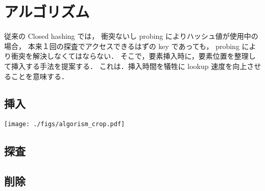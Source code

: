\chapter{アルゴリズム}
\label{chap_Algorism}

従来の Closed hashing では，
衝突ないし probing によりハッシュ値が使用中の場合，
本来１回の探査でアクセスできるはずの key であっても，
probing により衝突を解決しなくてはならない．
そこで，要素挿入時に，要素位置を整理して挿入する手法を提案する．
これは．挿入時間を犠牲に lookup 速度を向上させることを意味する．

\section{挿入}

\begin{center}
  \texttt{[image: ./figs/algorism\_crop.pdf]}
\end{center}
\leavevmode \newline
\leavevmode \newline


\section{探査}
\section{削除}











